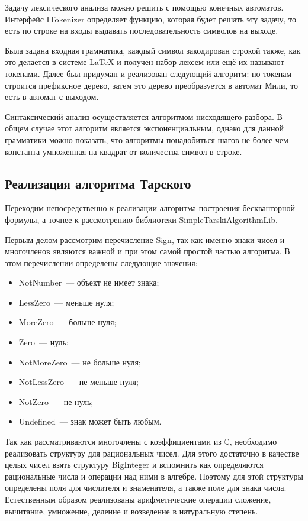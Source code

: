 Задачу лексического анализа можно решить с помощью конечных автоматов. Интерфейс ITokenizer определяет функцию, которая будет решать эту задачу, то есть по строке на входы выдавать последовательность символов на выходе.

Была задана входная грамматика, каждый символ закодирован строкой также, как это делается в системе LaTeX и получен набор лексем или ещё их называют токенами. Далее был придуман и реализован следующий алгоритм: по токенам строится префиксное дерево, затем это дерево преобразуется в автомат Мили, то есть в автомат с выходом.

Синтаксический анализ осуществляется алгоритмом нисходящего разбора. В общем случае этот алгоритм является экспоненциальным, однако для данной грамматики можно показать, что алгоритмы понадобиться шагов не более чем константа умноженная на квадрат от количества символ в строке.

\subsection{Реализация алгоритма Тарского}

Переходим непосредственно к реализации алгоритма построения бескванторной формулы, а точнее к рассмотрению библиотеки SimpleTarskiAlgorithmLib.

Первым делом рассмотрим перечисление Sign, так как именно знаки чисел и многочленов являются важной и при этом самой простой частью алгоритма. В этом перечислении определены следующие значения:
\begin{itemize}
    \item NotNumber~--- объект не имеет знака;
    \item LessZero~--- меньше нуля;
    \item MoreZero~--- больше нуля;
    \item Zero~--- нуль;
    \item NotMoreZero~--- не больше нуля;
    \item NotLessZero~--- не меньше нуля;
    \item NotZero~--- не нуль; 
    \item Undefined~--- знак может быть любым.
\end{itemize}

Так как рассматриваются многочлены с коэффициентами из $\mathbb{Q}$, необходимо реализовать структуру для рациональных чисел. Для этого достаточно в качестве целых чисел взять структуру BigInteger и вспомнить как определяются рациональные числа и операции над ними в алгебре. Поэтому для этой структуры определены поля для числителя и знаменателя, а также поле для знака числа. Естественным образом реализованы арифметические операции сложение, вычитание, умножение, деление и возведение в натуральную степень.

